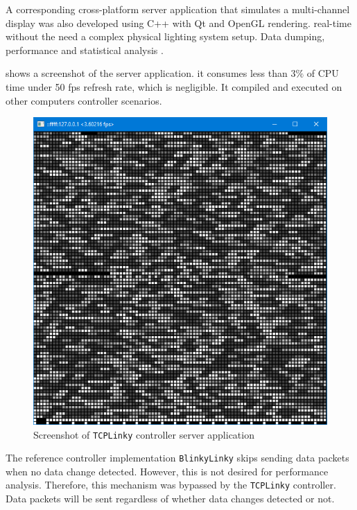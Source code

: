 A corresponding cross-platform server application that simulates a multi-channel display was also developed using C++ with Qt \cite{qt} and OpenGL \cite{shreiner2009opengl} rendering.   real-time  without the need  a complex physical lighting system setup. Data dumping, performance and statistical analysis .

 shows a screenshot of the server application.  it consumes less than $3 \%$ of CPU time under 50 fps refresh rate, which is negligible. It  compiled and executed on other computers   controller scenarios. 

\begin{figure}[t]
  \centering
  \includegraphics[width=0.6\columnwidth]{Figs/tcplinky_server.png}
  \caption{\footnotesize Screenshot of \texttt{TCPLinky} controller server application}
  \label{fig:tcplinky_server}
\end{figure}

The reference controller implementation \texttt{BlinkyLinky} skips sending data packets when no data change  detected. However, this is not desired for performance analysis. Therefore, this mechanism was bypassed by the \texttt{TCPLinky} controller. Data packets will be sent regardless of whether data changes  detected or not.

